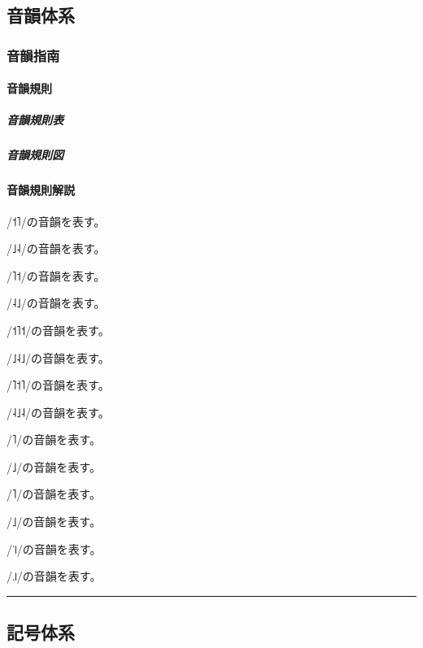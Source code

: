 \documentclass[
  japanese,
]{article}
\providecommand{\tightlist}{%
  \setlength{\itemsep}{0pt}\setlength{\parskip}{0pt}}
\begin{document}
\subsection{音韻体系}\label{chapter2}

\subsubsection{音韻指南}\label{section2.1}

\paragraph{音韻規則}\label{subsection2.1.1}

\subparagraph{音韻規則表}\label{subsubsection2.1.1.1}

\subparagraph{音韻規則図}\label{subsubsection2.1.1.2}

\paragraph{音韻規則解説}\label{subsection2.1.2}

\begin{description}
\tightlist
\item[{◌́}]
/{˦˥}/の音韻を表す。
\item[{◌̗}]
/{˩˨}/の音韻を表す。
\item[{◌̀}]
/{˥˦}/の音韻を表す。
\item[{◌̖}]
/{˨˩}/の音韻を表す。
\item[{◌̂}]
/{˦˥˦}/の音韻を表す。
\item[{◌̭}]
/{˩˨˩}/の音韻を表す。
\item[{◌̌}]
/{˥˦˥}/の音韻を表す。
\item[{◌̬}]
/{˨˩˨}/の音韻を表す。
\item[{◌̄}]
/{˥}/の音韻を表す。
\item[{◌̱}]
/{˩}/の音韻を表す。
\item[{◌̈}]
/{˥}/の音韻を表す。
\item[{◌̤}]
/{˩}/の音韻を表す。
\item[{◌̇}]
/{꜈}/の音韻を表す。
\item[{◌̣}]
/{꜌}/の音韻を表す。
\end{description}

\begin{center}\rule{0.5\linewidth}{0.5pt}\end{center}

\subsection{記号体系}\label{chapter3}
\end{document}
